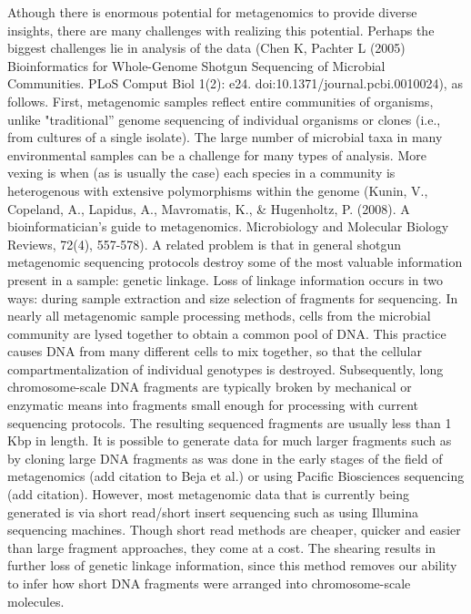\documentclass[10pt]{article}
\begin{document}
Athough there is enormous potential for metagenomics to provide diverse insights, there are many challenges with realizing this potential.
Perhaps the biggest challenges lie in analysis of the data (Chen K, Pachter L (2005) Bioinformatics for Whole-Genome Shotgun Sequencing of Microbial Communities. PLoS Comput Biol 1(2): e24. doi:10.1371/journal.pcbi.0010024), as follows.
First, metagenomic samples reflect entire communities of organisms, unlike "traditional'' genome sequencing of individual organisms or clones (i.e., from cultures of a single isolate).
The large number of microbial taxa in many environmental samples can be a challenge for many types of analysis.
More vexing is when (as is usually the case) each species in a community is heterogenous with extensive polymorphisms within the genome (Kunin, V., Copeland, A., Lapidus, A., Mavromatis, K., & Hugenholtz, P. (2008). A bioinformatician's guide to metagenomics. Microbiology and Molecular Biology Reviews, 72(4), 557-578).
A related problem is that in general shotgun metagenomic sequencing protocols destroy some of the most valuable information present in a sample: genetic linkage.
Loss of linkage information occurs in two ways: during sample extraction and size selection of fragments for sequencing.
In nearly all metagenomic sample processing methods, cells from the microbial community are lysed together to obtain a common pool of DNA.
This practice causes DNA from many different cells to mix together, so that the cellular compartmentalization of individual genotypes is destroyed.
Subsequently, long chromosome-scale DNA fragments are typically broken by mechanical or enzymatic means into fragments small enough for processing with current sequencing protocols.
The resulting sequenced fragments are usually less than 1 Kbp in length.  It is possible to generate data for much larger fragments such as by cloning large DNA fragments as was done in the early stages of the field of metagenomics (add citation to Beja et al.) or using Pacific Biosciences sequencing (add citation).  However, most metagenomic data that is currently being generated is via short read/short insert sequencing such as using Illumina sequencing machines.  Though short read methods are cheaper, quicker and easier than large fragment approaches, they come at a cost.  The shearing results in further loss of genetic linkage information, since this method removes our ability to infer how short DNA fragments were arranged into chromosome-scale molecules.
\end{document}
